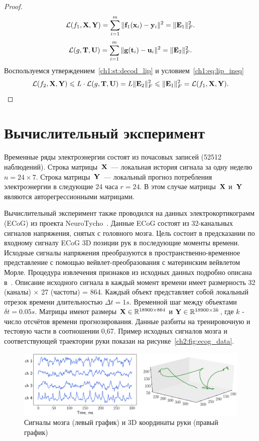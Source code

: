 \begin{proof}
	\[
		\mathcal{L} (f_1, \mathbf{X}, \mathbf{Y}) = \sum_{i=1}^m \| \mathbf{f}_1(\mathbf{x}_i) - \mathbf{y}_i\|^2 = \| \mathbf{E}_1 \|_F^2.
	\]
	\[
	\mathcal{L} (g, \mathbf{T}, \mathbf{U}) = \sum_{i=1}^m \| \mathbf{g}(\mathbf{t}_i) - \mathbf{u}_i\|^2 = \| \mathbf{E}_2 \|_F^2.
	\]
	Воспользуемся утверждением~\ref{ch1:st:decod_lip} и условием~\eqref{ch1:eq:lip_ineq}
	\[
		\mathcal{L} (f_2, \mathbf{X}, \mathbf{Y}) \leqslant L \cdot \mathcal{L}(g, \mathbf{T}, \mathbf{U}) = L \| \mathbf{E}_2 \|_F^2 \leqslant \| \mathbf{E}_1 \|_F^2 = \mathcal{L}(f_1, \mathbf{X}, \mathbf{Y}).
	\]
\end{proof}

\hrulefill

\section{Вычислительный эксперимент}

Временные ряды электроэнергии состоят из почасовых записей (52512 наблюдений). 
Строка матрицы~$\mathbf{X}$~--– локальная история сигнала за одну неделю $n = 24 \times 7$. Строка матрицы~$\mathbf{Y}$~--- локальный прогноз потребления электроэнергии в следующие 24 часа $r = 24$. В этом случае матрицы~$\mathbf{X}$ и~$\mathbf{Y}$ являются авторегрессионными матрицами.

Вычислительный эксперимент также проводился на данных электрокортикограмм (ECoG) из проекта NeuroTycho~\cite{shimoda2012decoding}.
Данные ECoG состоят из 32-канальных сигналов напряжения, снятых с головного мозга.
Цель состоит в предсказании по входному сигналу ECoG 3D позиции рук в последующие моменты времени.
Исходные сигналы напряжения преобразуются в пространственно-временное представление с помощью вейвлет-преобразования с материнским вейвлетом Морле.
Процедура извлечения признаков из исходных данных подробно описана в~\cite{chao2010long,eliseyev2016penalized}.
Описание исходного сигнала в каждый момент времени имеет размерность 32 (каналы) $\times $ 27 (частоты) = 864.
Каждый объект представляет собой локальный отрезок времени длительностью $\Delta t = 1s$. Временной шаг между объектами $\delta t = 0.05 s$.
Матрицы имеют размеры $\mathbf{X} \in \mathbb{R}^{18900 \times 864}$ и $\mathbf{Y} \in \mathbb{R}^{18900 \times 3k}$, где $k$ - число отсчётов времени прогнозирования.
Данные разбиты на тренировочную и тестовую части в соотношении 0,67. 
Пример исходных сигналов мозга и соответствующей траектории руки показан на рисунке~\ref{ch2:fig:ecog_data}.

\begin{figure}
	\centering
	\includegraphics[width=\linewidth]{figs/ch2/ecog_data}
	\caption{Сигналы мозга (левый график) и 3D координаты руки (правый график)}
	\label{ch1:fig:ecog_data}
\end{figure}

